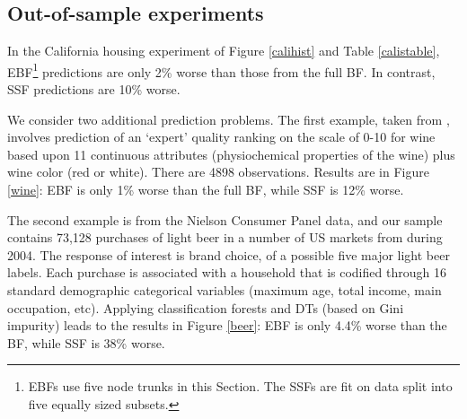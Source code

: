\documentclass{article}
\begin{document}
\subsection{Out-of-sample experiments}\label{oos-experiment}

 
In the California housing  experiment of Figure \ref{calihist}
and Table \ref{calistable}, EBF\footnote{EBFs use five node trunks  in this Section.  The SSFs are fit on data split into five equally sized subsets.} predictions are only 2\% worse than those from the full BF.  In contrast, SSF predictions are 10\% worse.

We consider two additional prediction problems.  The first example, 
taken from \cite{CorCer09}, involves prediction of an `expert' quality ranking on
the scale of 0-10 for wine based upon 11 continuous attributes (physiochemical properties of the wine) plus
wine color (red or white).  There are 4898 observations.  Results are in Figure \ref{wine}:  EBF is only 1\% worse than the full BF, while SSF is 12\% worse.

The second example is from the Nielson Consumer Panel data,
and our sample contains 73,128 purchases of light beer in a number of US
markets from during 2004. The response of interest is brand choice, of a
possible five major light beer labels.
Each purchase is associated with a household that is codified through
16 standard demographic categorical variables (maximum age, total income, main
occupation, etc).  Applying classification forests and DTs (based on Gini impurity) leads to the results in Figure \ref{beer}:  EBF is only 4.4\% worse than the BF, while  SSF is 38\% worse.
\end{document}
